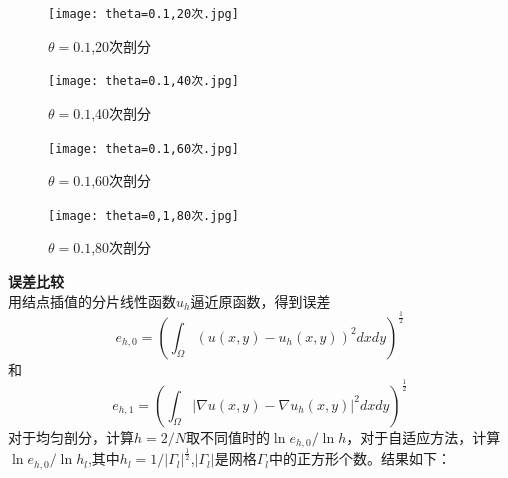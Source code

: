 \documentclass[12pt]{ctexart}
\begin{document}
\begin{figure}[H]
	\centering
	\begin{minipage}[t]{0.48\textwidth}
		\centering
		\texttt{[image: theta=0.1,20次.jpg]}
		\caption{$\theta=0.1$,20次剖分}
	\end{minipage}
	\begin{minipage}[t]{0.48\textwidth}
		\centering
		\texttt{[image: theta=0.1,40次.jpg]}
		\caption{$\theta=0.1$,40次剖分}
	\end{minipage}
\end{figure}
\begin{figure}[H]
	\centering
	\begin{minipage}[t]{0.48\textwidth}
		\centering
		\texttt{[image: theta=0.1,60次.jpg]}
		\caption{$\theta=0.1$,60次剖分}
	\end{minipage}
	\begin{minipage}[t]{0.48\textwidth}
		\centering
		\texttt{[image: theta=0,1,80次.jpg]}
		\caption{$\theta=0.1$,80次剖分}
	\end{minipage}
\end{figure}
\noindent \textbf{误差比较}\\
用结点插值的分片线性函数$u_h$逼近原函数，得到误差
$$e_{h,0} = (\int_{\Omega}(u(x,y)-u_h(x,y))^2dxdy)^\frac{1}{2}$$
和
$$e_{h,1} = (\int_{\Omega}|\nabla u(x,y)-\nabla u_h(x,y)|^2dxdy)^\frac{1}{2}$$
对于均匀剖分，计算$h=2/N$取不同值时的$\ln e_{h,0}/\ln{h}$，对于自适应方法，计算$\ln e_{h,0}/\ln{h_l}$,其中$h_l=1/|\varGamma_{l}|^\frac{1}{2}$,$|\varGamma_{l}|$是网格$\varGamma_{l}$中的正方形个数。结果如下：\\
\end{document}
